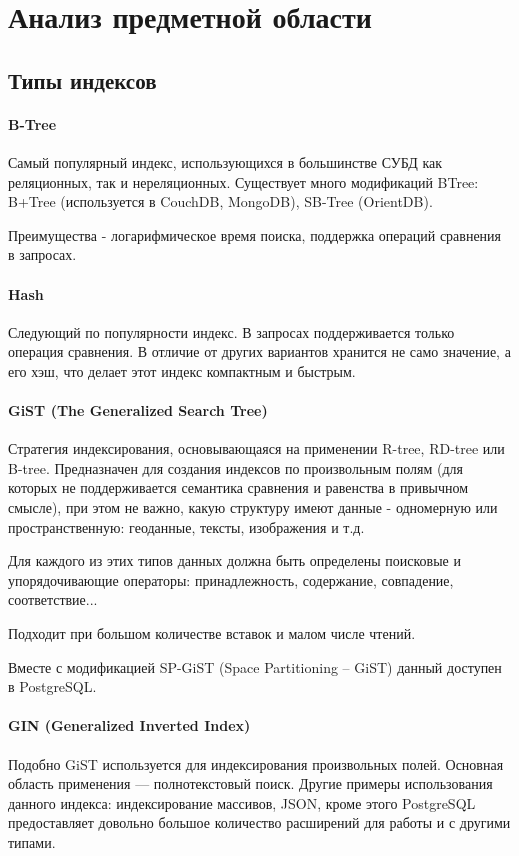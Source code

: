 \chapter{Анализ предметной области} \label{chapt1}
\section{Типы индексов}
\subsubsection{B-Tree}
Самый популярный индекс, использующихся в большинстве СУБД как реляционных, так и нереляционных.
Существует много модификаций BTree: B+Tree (используется в CouchDB, MongoDB), SB-Tree (OrientDB).

Преимущества - логарифмическое время поиска, поддержка операций сравнения в запросах.

\subsubsection{Hash}
Следующий по популярности индекс. В запросах поддерживается только операция сравнения. В отличие от других вариантов хранится не само значение, а его хэш, что делает этот индекс компактным и быстрым.

\subsubsection{GiST (The Generalized Search Tree)}
Стратегия индексирования, основывающаяся на применении R-tree, RD-tree или B-tree. Предназначен для создания индексов по произвольным полям (для которых не поддерживается семантика сравнения и равенства в привычном смысле), при этом не важно, какую структуру имеют данные - одномерную или пространственную: геоданные, тексты, изображения и т.д.

Для каждого из этих типов данных должна быть определены поисковые и упорядочивающие операторы: принадлежность, содержание, совпадение, соответствие...

Подходит при большом количестве вставок и малом числе чтений.

Вместе с модификацией SP-GiST (Space Partitioning -- GiST) данный доступен в PostgreSQL.

\subsubsection{GIN (Generalized Inverted Index)}
Подобно GiST используется для индексирования произвольных полей.
Основная область применения --- полнотекстовый поиск. Другие примеры использования данного индекса: индексирование массивов, JSON, кроме этого PostgreSQL предоставляет довольно большое количество расширений для работы и с другими типами.

